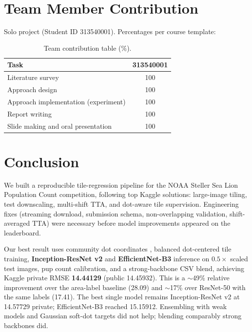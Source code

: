\documentclass[12pt, a4paper]{article}
\begin{document}
\section{Team Member Contribution}

Solo project (Student ID 313540001). Percentages per course template:

\begin{table}[htbp]
\centering
\caption{Team contribution table (\%).}
\label{tab:team}
\begin{tabular}{@{}lc@{}}
\toprule
\textbf{Task} & \textbf{313540001} \\ \midrule
Literature survey & 100 \\
Approach design & 100 \\
Approach implementation (experiment) & 100 \\
Report writing & 100 \\
Slide making and oral presentation & 100 \\ \bottomrule
\end{tabular}
\end{table}

\section{Conclusion}

We built a reproducible tile-regression pipeline for the NOAA Steller Sea Lion Population Count competition, following top Kaggle solutions: large-image tiling, test downscaling, multi-shift TTA, and dot-aware tile supervision. Engineering fixes (streaming download, submission schema, non-overlapping validation, shift-averaged TTA) were necessary before model improvements appeared on the leaderboard.

Our best result uses community dot coordinates \cite{lopuhin2017}, balanced dot-centered tile training, \textbf{Inception-ResNet v2} and \textbf{EfficientNet-B3} inference on $0.5\times$ scaled test images, pup count calibration, and a strong-backbone CSV blend, achieving Kaggle private RMSE \textbf{14.44129} (public 14.45932). This is a $\sim$49\% relative improvement over the area-label baseline (28.09) and $\sim$17\% over ResNet-50 with the same labels (17.41). The best single model remains Inception-ResNet v2 at 14.57729 private; EfficientNet-B3 reached 15.15912. Ensembling with weak models and Gaussian soft-dot targets did not help; blending comparably strong backbones did.
\end{document}
